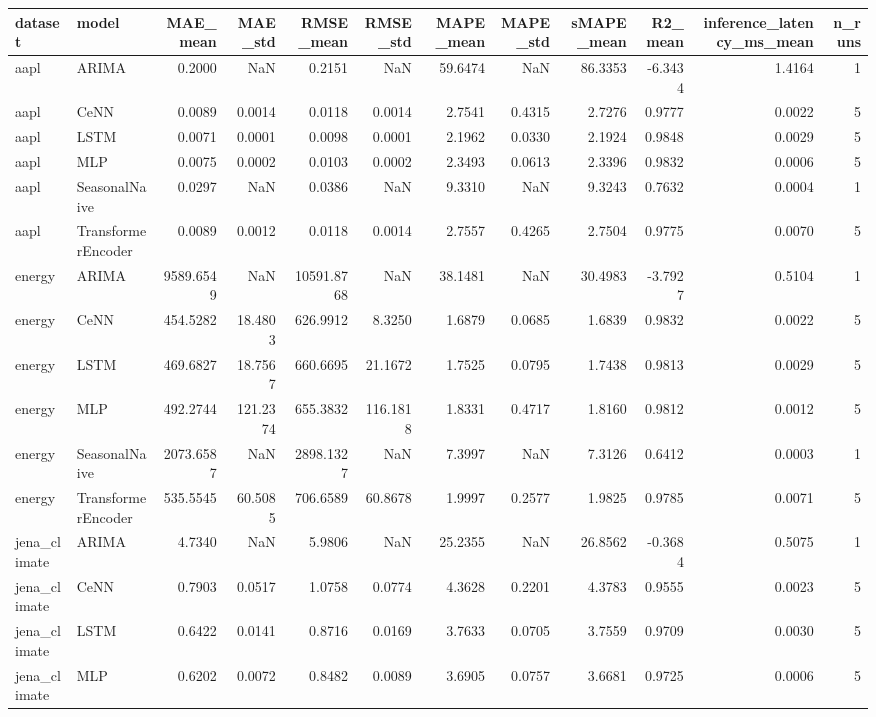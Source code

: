 \begin{tabular}{llrrrrrrrrrr}
\toprule
dataset & model & MAE_mean & MAE_std & RMSE_mean & RMSE_std & MAPE_mean & MAPE_std & sMAPE_mean & R2_mean & inference_latency_ms_mean & n_runs \\
\midrule
aapl & ARIMA & 0.2000 & NaN & 0.2151 & NaN & 59.6474 & NaN & 86.3353 & -6.3434 & 1.4164 & 1 \\
aapl & CeNN & 0.0089 & 0.0014 & 0.0118 & 0.0014 & 2.7541 & 0.4315 & 2.7276 & 0.9777 & 0.0022 & 5 \\
aapl & LSTM & 0.0071 & 0.0001 & 0.0098 & 0.0001 & 2.1962 & 0.0330 & 2.1924 & 0.9848 & 0.0029 & 5 \\
aapl & MLP & 0.0075 & 0.0002 & 0.0103 & 0.0002 & 2.3493 & 0.0613 & 2.3396 & 0.9832 & 0.0006 & 5 \\
aapl & SeasonalNaive & 0.0297 & NaN & 0.0386 & NaN & 9.3310 & NaN & 9.3243 & 0.7632 & 0.0004 & 1 \\
aapl & TransformerEncoder & 0.0089 & 0.0012 & 0.0118 & 0.0014 & 2.7557 & 0.4265 & 2.7504 & 0.9775 & 0.0070 & 5 \\
energy & ARIMA & 9589.6549 & NaN & 10591.8768 & NaN & 38.1481 & NaN & 30.4983 & -3.7927 & 0.5104 & 1 \\
energy & CeNN & 454.5282 & 18.4803 & 626.9912 & 8.3250 & 1.6879 & 0.0685 & 1.6839 & 0.9832 & 0.0022 & 5 \\
energy & LSTM & 469.6827 & 18.7567 & 660.6695 & 21.1672 & 1.7525 & 0.0795 & 1.7438 & 0.9813 & 0.0029 & 5 \\
energy & MLP & 492.2744 & 121.2374 & 655.3832 & 116.1818 & 1.8331 & 0.4717 & 1.8160 & 0.9812 & 0.0012 & 5 \\
energy & SeasonalNaive & 2073.6587 & NaN & 2898.1327 & NaN & 7.3997 & NaN & 7.3126 & 0.6412 & 0.0003 & 1 \\
energy & TransformerEncoder & 535.5545 & 60.5085 & 706.6589 & 60.8678 & 1.9997 & 0.2577 & 1.9825 & 0.9785 & 0.0071 & 5 \\
jena_climate & ARIMA & 4.7340 & NaN & 5.9806 & NaN & 25.2355 & NaN & 26.8562 & -0.3684 & 0.5075 & 1 \\
jena_climate & CeNN & 0.7903 & 0.0517 & 1.0758 & 0.0774 & 4.3628 & 0.2201 & 4.3783 & 0.9555 & 0.0023 & 5 \\
jena_climate & LSTM & 0.6422 & 0.0141 & 0.8716 & 0.0169 & 3.7633 & 0.0705 & 3.7559 & 0.9709 & 0.0030 & 5 \\
jena_climate & MLP & 0.6202 & 0.0072 & 0.8482 & 0.0089 & 3.6905 & 0.0757 & 3.6681 & 0.9725 & 0.0006 & 5 \\

\end{tabular}

